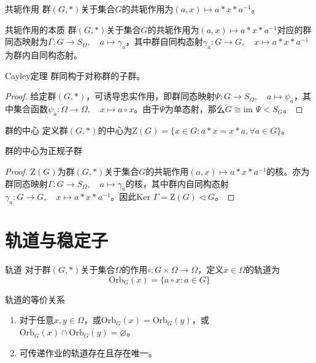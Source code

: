 \documentclass[lang = cn, scheme = chinese, thmcnt = section]{elegantbook}
\begin{document}
\begin{definition}{共轭作用}
	群$(G,*)$关于集合$G$的共轭作用为$(a,x)\mapsto a*x*a^{-1}$。
\end{definition}

\begin{theorem}{共轭作用的本质}
	群$(G,*)$关于集合$G$的共轭作用为$(a,x)\mapsto a*x*a^{-1}$对应的群同态映射为$\Gamma:G\to S_\Omega,\quad a\mapsto \gamma_{a}$，其中群自同构态射$\gamma_{a}:G\to G,\quad x\mapsto a* x *a^{-1}$为群内自同构态射。
\end{theorem}

\begin{theorem}{Cayley定理}
	群同构于对称群的子群。
\end{theorem}

\begin{proof}
	给定群$(G,*)$，可诱导忠实作用，即群同态映射$\Psi:G\to S_{\Omega},\quad a\mapsto \psi_{a}$，其中集合函数$\psi_{a}:\Omega\to \Omega,\quad x\mapsto a\circ x$。由于$\Psi$为单态射，那么$G\cong \text{im }\Psi <S_G$。
\end{proof}

\begin{definition}{群的中心}
	定义群$(G,*)$的中心为$\mathrm{Z}(G)=\{ x\in G:a*x=x*a,\forall a\in G \}$。
\end{definition}

\begin{proposition}
	群的中心为正规子群
\end{proposition}

\begin{proof}
	$\mathrm{Z}(G)$为群$(G,*)$关于集合$G$的共轭作用$(a,x)\mapsto a*x*a^{-1}$的核。亦为群同态映射$\Gamma:G\to S_\Omega,\quad a\mapsto \gamma_{a}$的核，其中群内自同构态射$\gamma_{a}:G\to G,\quad x\mapsto a* x *a^{-1}$。因此$\text{Ker } \Gamma=\mathrm{Z}(G)\triangleleft G$。
\end{proof}

\section{轨道与稳定子}

\begin{definition}{轨道}
	对于群$(G,*)$关于集合$\Omega$的作用$\circ:G\times \Omega\to \Omega$，定义$x\in\Omega$的轨道为
	$$
	\mathrm{Orb}_G(x)=\{ a\circ x:a\in G \}
	$$
\end{definition}

\begin{proposition}{轨道的等价关系}
	\begin{enumerate}
		\item 对于任意$x,y\in\Omega$，或$\mathrm{Orb}_G(x)=\mathrm{Orb}_G(y)$，或$\mathrm{Orb}_G(x)\cap\mathrm{Orb}_G(y)=\varnothing$。
		\item 可传递作业的轨道存在且存在唯一。
	\end{enumerate}
\end{proposition}
\end{document}
